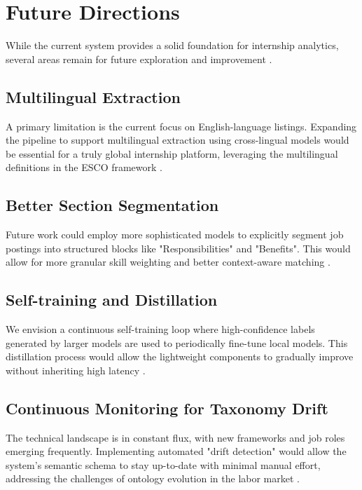\section{Future Directions}
While the current system provides a solid foundation for internship analytics, several areas remain for future exploration and improvement \cite{tamburri2020data, lacic2020recommender}.

\subsection{Multilingual Extraction}
A primary limitation is the current focus on English-language listings. Expanding the pipeline to support multilingual extraction using cross-lingual models would be essential for a truly global internship platform, leveraging the multilingual definitions in the ESCO framework \cite{lin2021pretrained}.

\subsection{Better Section Segmentation}
Future work could employ more sophisticated models to explicitly segment job postings into structured blocks like "Responsibilities" and "Benefits". This would allow for more granular skill weighting and better context-aware matching \cite{qin2018enhancing, bhola2020retrieving}.

\subsection{Self-training and Distillation}
We envision a continuous self-training loop where high-confidence labels generated by larger models are used to periodically fine-tune local models. This distillation process would allow the lightweight components to gradually improve without inheriting high latency \cite{hsieh2023distilling}.

\subsection{Continuous Monitoring for Taxonomy Drift}
The technical landscape is in constant flux, with new frameworks and job roles emerging frequently. Implementing automated "drift detection" would allow the system's semantic schema to stay up-to-date with minimal manual effort, addressing the challenges of ontology evolution in the labor market \cite{shvaiko2013ontology, staab2009handbook}.
